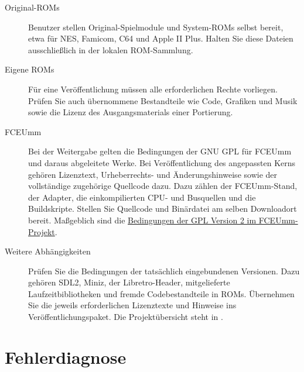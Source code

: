 \documentclass[fontsize=10.2bp,DIV=calc,oneside,open=any,headings=normal,numbers=noenddot]{scrbook}
\begin{document}
\begin{description}
  \item[Original-ROMs] Benutzer stellen Original-Spielmodule und
    System-ROMs selbst bereit, etwa für NES, Famicom, C64 und Apple II Plus.
    Halten Sie diese Dateien ausschließlich in der lokalen ROM-Sammlung.
  \item[Eigene ROMs] Für eine Veröffentlichung müssen alle erforderlichen
    Rechte vorliegen. Prüfen Sie auch übernommene Bestandteile wie Code,
    Grafiken und Musik sowie die Lizenz des Ausgangsmaterials einer Portierung.
  \item[FCEUmm] Bei der Weitergabe gelten die Bedingungen der GNU GPL
    für FCEUmm und daraus abgeleitete Werke. Bei Veröffentlichung des angepassten Kerns
    gehören Lizenztext, Urheberrechts- und Änderungshinweise sowie der
    vollständige zugehörige Quellcode dazu. Dazu zählen der FCEUmm-Stand,
    der Adapter, die einkompilierten CPU- und Busquellen und die
    Buildskripte. Stellen Sie Quellcode und Binärdatei am selben
    Downloadort bereit. Maßgeblich sind die
    \href{https://github.com/libretro/libretro-fceumm/blob/master/Copying}{Bedingungen der GPL Version 2 im FCEUmm-Projekt}.
  \item[Weitere Abhängigkeiten] Prüfen Sie die Bedingungen der tatsächlich
    eingebundenen Versionen. Dazu gehören SDL2, Miniz, der Libretro-Header,
    mitgelieferte Laufzeitbibliotheken und fremde Codebestandteile in ROMs.
    Übernehmen Sie die jeweils erforderlichen Lizenztexte und Hinweise ins
    Veröffentlichungspaket. Die Projektübersicht steht in
    .
\end{description}

\chapter{Fehlerdiagnose}\label{ch:trouble}
\end{document}
